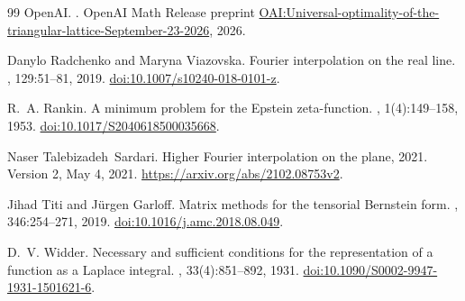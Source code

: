 \documentclass[11pt]{article}
\theoremstyle{remark}\newtheorem{remark}[theorem]{Remark}
\begin{document}
\begin{thebibliography}{99}
OpenAI.
.
\newblock OpenAI Math Release preprint
\href{https://github.com/openai/math/blob/main/preprints/Universal-optimality-of-the-triangular-lattice-September-23-2026/paper.pdf}{OAI:Universal-optimality-of-the-triangular-lattice-September-23-2026}, 2026.

Danylo Radchenko and Maryna Viazovska.
\newblock Fourier interpolation on the real line.
, 129:51--81, 2019.
\newblock \href{https://doi.org/10.1007/s10240-018-0101-z}{doi:10.1007/s10240-018-0101-z}.

R.~A. Rankin.
\newblock A minimum problem for the {Epstein} zeta-function.
,
  1(4):149--158, 1953.
\newblock \href{https://doi.org/10.1017/S2040618500035668}{doi:10.1017/S2040618500035668}.

Naser Talebizadeh~Sardari.
\newblock Higher {Fourier} interpolation on the plane, 2021.
\newblock Version 2, May 4, 2021.
\newblock \url{https://arxiv.org/abs/2102.08753v2}.

Jihad Titi and J{\"u}rgen Garloff.
\newblock Matrix methods for the tensorial {Bernstein} form.
, 346:254--271, 2019.
\newblock \href{https://doi.org/10.1016/j.amc.2018.08.049}{doi:10.1016/j.amc.2018.08.049}.

D.~V. Widder.
\newblock Necessary and sufficient conditions for the representation of a
  function as a {Laplace} integral.
,
  33(4):851--892, 1931.
\newblock \href{https://doi.org/10.1090/S0002-9947-1931-1501621-6}{doi:10.1090/S0002-9947-1931-1501621-6}.


\end{thebibliography}
\end{document}
